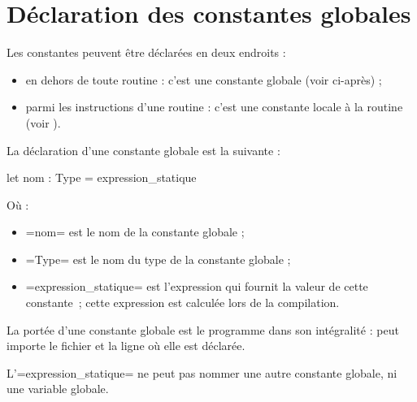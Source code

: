




\chapter{Déclaration des constantes globales}

Les constantes peuvent être déclarées en deux endroits :
\begin{itemize}
  \item en dehors de toute routine : c'est une constante globale (voir ci-après) ;
  \item parmi les instructions d'une routine : c'est une constante locale à la routine (voir ).
\end{itemize}





La déclaration d'une constante globale est la suivante :

\begin{PLM}
let nom : Type = expression_statique
\end{PLM}

Où :
\begin{itemize}
  \item \plm=nom= est le nom de la constante globale ;
  \item \plm=Type= est le nom du type de la constante globale ;
  \item \plm=expression_statique= est l'expression qui fournit la valeur de cette constante~; cette expression est calculée lors de la compilation.
\end{itemize}

La portée d'une constante globale est le programme dans son intégralité : peut importe le fichier et la ligne où elle est déclarée.

L'\plm=expression_statique= ne peut pas nommer une autre constante globale, ni une variable globale. 

